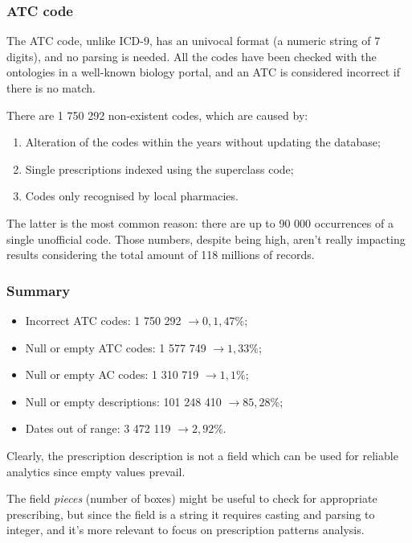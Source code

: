 \subsubsection{ATC code}
The ATC code, unlike ICD-9, has an univocal format (a numeric string of 7 digits), and no parsing is needed. All the codes have been checked with the ontologies in a well-known biology portal\cite{atc}, and an ATC is considered incorrect if there is no match.

There are 1 750 292 non-existent codes, which are caused by:
\begin{enumerate}
	\item Alteration of the codes within the years without updating the database;
	\item Single prescriptions indexed using the superclass code;
	\item Codes only recognised by local pharmacies.
\end{enumerate}

The latter is the most common reason: there are up to 90 000 occurrences of a single unofficial code. Those numbers, despite being high, aren't really impacting results considering the total amount of 118 millions of records.

\subsubsection{Summary}
\begin{itemize}
	\item Incorrect ATC codes: 1 750 292 $\rightarrow 0,1,47\%$;
	\item Null or empty ATC codes: 1 577 749 $\rightarrow 1,33\%$;
	\item Null or empty AC codes: 1 310 719 $\rightarrow 1,1\%$;
	\item Null or empty descriptions: 101 248 410 $\rightarrow 85,28\%$;
	\item Dates out of range: 3 472 119 $\rightarrow 2,92\%$.
\end{itemize}

Clearly, the prescription description is not a field which can be used for reliable analytics since empty values prevail.

The field \textit{pieces} (number of boxes) might be useful to check for appropriate prescribing, but since the field is a string it requires casting and parsing to integer, and it's more relevant to focus on prescription patterns analysis.


